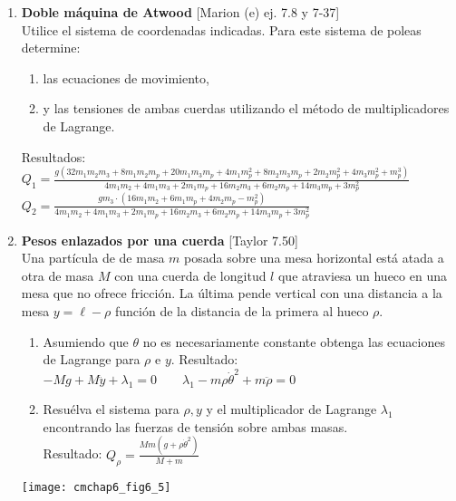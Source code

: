 \documentclass[11pt, spanish, a4paper, twoside]{article}
\begin{document}
\begin{enumerate}
	
	\item
	\begin{minipage}[t][6.5cm]{0.65\textwidth}
	\textbf{Doble máquina de Atwood} [Marion (e) ej. 7.8 y 7-37]\\
	Utilice el sistema de coordenadas indicadas.
	Para este sistema de poleas determine: 
	\begin{enumerate}
		\item las ecuaciones de movimiento,
		\item y las tensiones de ambas cuerdas utilizando el método de multiplicadores de Lagrange.
	\end{enumerate}
	Resultados:\\
	\(
		Q_{1} = \frac{g \left(32 m_{1} m_{2} m_{3} + 8 m_{1} m_{2} m_{p} + 20 m_{1} m_{3} m_{p} + 4 m_{1} m_{p}^{2} + 8 m_{2} m_{3} m_{p} + 2 m_{2} m_{p}^{2} + 4 m_{3} m_{p}^{2} + m_{p}^{3}\right)}{4 m_{1} m_{2} + 4 m_{1} m_{3} + 2 m_{1} m_{p} + 16 m_{2} m_{3} + 6 m_{2} m_{p} + 14 m_{3} m_{p} + 3 m_{p}^{2}}
	\)\\
	\(
		Q_{2} = \frac{g m_{3} \cdot \left(16 m_{1} m_{2} + 6 m_{1} m_{p} + 4 m_{2} m_{p} - m_{p}^{2}\right)}{4 m_{1} m_{2} + 4 m_{1} m_{3} + 2 m_{1} m_{p} + 16 m_{2} m_{3} + 6 m_{2} m_{p} + 14 m_{3} m_{p} + 3 m_{p}^{2}}
	\)
	\end{minipage}
	\begin{minipage}[c][0.5cm][t]{0.3\textwidth}
		
	\end{minipage}


	\item
	\begin{minipage}[t][6cm]{0.65\textwidth}
		\textbf{Pesos enlazados por una cuerda} [Taylor 7.50]\\
		Una partícula de de masa \(m\) posada sobre una mesa horizontal está atada a otra de masa \(M\) con una cuerda de longitud \(l\) que atraviesa un hueco en una mesa que no ofrece fricción.
		La última pende vertical con una distancia a la mesa \(y = \ell - \rho\) función de la distancia de la primera al hueco \(\rho\).
		\begin{enumerate}
			\item Asumiendo que \(\theta\) no es necesariamente constante obtenga las ecuaciones de Lagrange para \(\rho\) e  \(y\). Resultado:\\ \(- M g + M \ddot{y} + \lambda_{1} = 0 \qquad \lambda_{1} - m \rho \dot{\theta}^{2} + m \ddot{\rho} = 0\)
			\item Resuélva el sistema para \(\rho, y\) y el multiplicador de Lagrange \(\lambda_1\) encontrando las fuerzas de tensión sobre ambas masas.\\
			Resultado: \(Q_{\rho} = \frac{M m \left(g + \rho \dot{\theta}^{2}\right)}{M + m}\)
		\end{enumerate}
	\end{minipage}
	\begin{minipage}[c][0cm][t]{0.3\textwidth}
		\texttt{[image: cmchap6\_fig6\_5]}
	\end{minipage}



\end{enumerate}
\end{document}
